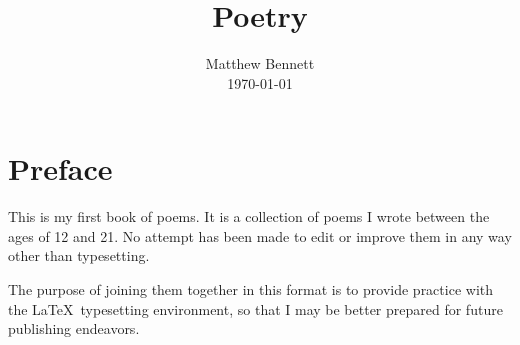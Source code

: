 \documentclass[times,12pt]{book}
\begin{document}
\frontmatter

\title{Poetry}
\author{Matthew Bennett \\ {\small \today} }
\date{}

\maketitle

\section*{Preface}

This is my first book of poems. It is a collection of poems I wrote
between the ages of 12 and 21. No attempt has been made to edit or
improve them in any way other than typesetting.

The purpose of joining them together in this format is to provide
practice with the \LaTeX\ typesetting environment, so that I may be
better prepared for future publishing endeavors.


\mainmatter
\end{document}
